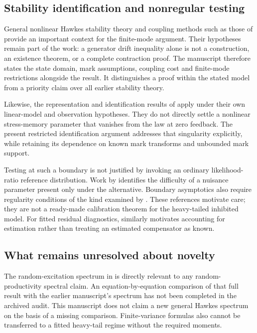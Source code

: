 \subsection{Stability identification and nonregular testing}

General nonlinear Hawkes stability theory \citep{BremaudMassoulie1996} and coupling methods such as those of \citet{HairerMattinglyScheutzow2011} provide an important context for the finite-mode argument. Their hypotheses remain part of the work: a generator drift inequality alone is not a construction, an existence theorem, or a complete contraction proof. The manuscript therefore states the state domain, mark assumptions, coupling cost and finite-mode restrictions alongside the result. It distinguishes a proof within the stated model from a priority claim over all earlier stability theory.

Likewise, the representation and identification results of \citet{DavisKresinBaeumerWang2026} apply under their own linear-model and observation hypotheses. They do not directly settle a nonlinear stress-memory parameter that vanishes from the law at zero feedback. The present restricted identification argument addresses that singularity explicitly, while retaining its dependence on known mark transforms and unbounded mark support.

Testing at such a boundary is not justified by invoking an ordinary likelihood-ratio reference distribution. Work by \citet{Davies1977,Davies1987} identifies the difficulty of a nuisance parameter present only under the alternative. Boundary asymptotics also require regularity conditions of the kind examined by \citet{SelfLiang1987}. These references motivate care; they are not a ready-made calibration theorem for the heavy-tailed inhibited model. For fitted residual diagnostics, \citet{KlingVetter2024} similarly motivates accounting for estimation rather than treating an estimated compensator as known.

\subsection{What remains unresolved about novelty}

The random-excitation spectrum in \citet{BremaudMassoulie2002} is directly relevant to any random-productivity spectral claim. An equation-by-equation comparison of that full result with the earlier manuscript's spectrum has not been completed in the archived audit. This manuscript does not claim a new general Hawkes spectrum on the basis of a missing comparison. Finite-variance formulas also cannot be transferred to a fitted heavy-tail regime without the required moments.

